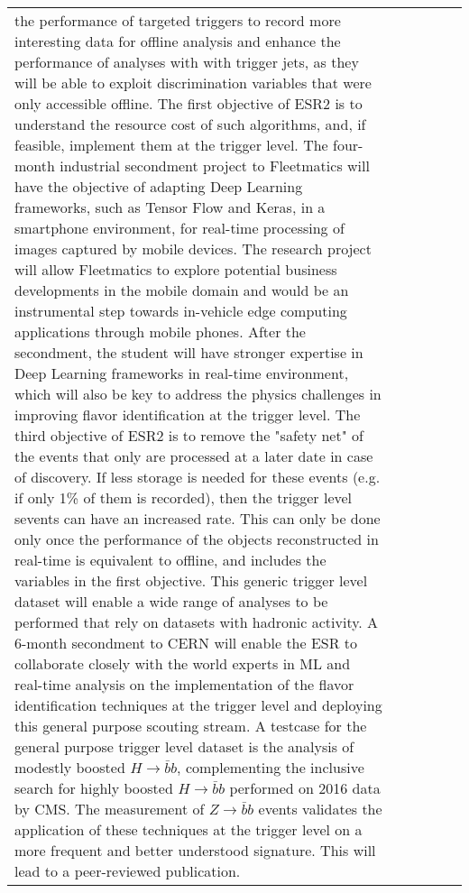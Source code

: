 \begin{center}
{\begin{tabular}{|p{16mm}|p{33mm}|p{28mm}|p{18mm}|p{18mm}|p{67mm}|}
{the performance of targeted triggers to record more
interesting data for offline analysis and enhance the performance of analyses with
with trigger jets, as they will be able to exploit discrimination variables that
were only accessible offline. The first objective of ESR2 is to understand the
resource cost of such algorithms, and, if feasible, implement them at the trigger level. 
The four-month industrial secondment project to Fleetmatics will have the objective of
adapting Deep Learning frameworks, such as Tensor Flow and Keras,
in a smartphone environment, for real-time processing of images captured by mobile devices. 
The research project will allow Fleetmatics to explore potential business developments
in the mobile domain and would be an instrumental step towards in-vehicle edge computing
applications through mobile phones. 
After the secondment, the student will have stronger expertise in Deep Learning
frameworks in real-time environment, which will also be key to address the physics challenges
in improving flavor identification at the trigger level.
The third objective of ESR2 is to remove the "safety net" of the events that only 
are processed at a later date in case of discovery. If less 
storage is needed for these events (e.g. if only 1\% of them is recorded), 
then the trigger level sevents can have an increased rate. 
This can only be done only once the performance of the objects reconstructed in
real-time is equivalent to offline, and includes the variables in the first objective. 
This generic trigger level dataset will enable a wide range of analyses
to be performed that rely on datasets with hadronic activity. 
A 6-month secondment to CERN will enable the ESR to collaborate closely 
with the world experts in ML and real-time analysis
on the implementation of the flavor identification techniques at the trigger level
and deploying this general purpose scouting stream.  
A testcase for the general purpose trigger level dataset is the analysis of
modestly boosted $H\rightarrow\bar{b}b$,
complementing the inclusive search for highly boosted $H\rightarrow\bar{b}b$
performed on 2016 data by CMS. The measurement of $Z\rightarrow\bar{b}b$ events
validates the application of these techniques at the trigger level
on a more frequent and better understood signature. This will lead to
a peer-reviewed publication. 
}
\end{tabular}}
\end{center}
